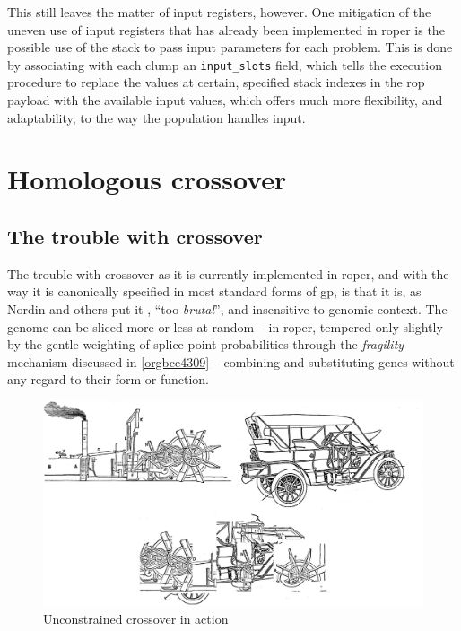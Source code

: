 \documentclass[12pt,glossary]{dalthesis}
\begin{document}
This still leaves the matter of input registers, however. One mitigation of the uneven use of
input registers that has already been implemented in \gls{roper} is the possible use of the
stack to pass input parameters for each problem. This is done by associating with each
clump an \texttt{input\_slots} field, which tells the execution procedure to replace the values at
certain, specified stack indexes in the \gls{rop} payload with the available input values, which
offers much more flexibility, and adaptability, to the way the population handles input. 

\section{Homologous crossover}
\label{sec:orge1db262}
\label{orga116b7b}
\subsection{The trouble with crossover}
\label{sec:org3d1bd74}
The trouble with crossover as it is currently implemented in \gls{roper}, and with
the way it is canonically specified in most standard forms of \gls{gp},
is that it is, as Nordin and others put it \cite{nordin99}, ``too \emph{brutal}'', and
insensitive to genomic context. The genome can be sliced more or less at random --
in \gls{roper}, tempered only slightly by the gentle weighting of splice-point probabilities
through the \emph{fragility} mechanism discussed in \ref{orgbce4309} -- combining and substituting
genes without any regard to their form or function.

\begin{figure}[htbp]
\centering
\includegraphics[width=.9\linewidth]{../images/carboat-montage.png}
\caption{\label{fig:org67d430e}
Unconstrained crossover in action}
\end{figure}
\end{document}

